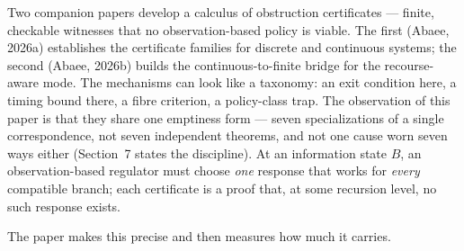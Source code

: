\documentclass[10pt,twocolumn]{article}
\theoremstyle{definition}
\begin{document}
Two companion papers develop a calculus of obstruction certificates --- finite,
checkable witnesses that no observation-based policy is viable. The first
(Abaee, 2026a) establishes the certificate families for discrete and
continuous systems; the second (Abaee, 2026b) builds the
continuous-to-finite bridge for the recourse-aware mode. The mechanisms can
look like a taxonomy: an exit condition here, a timing bound there, a fibre
criterion, a policy-class trap. The observation of this paper is that they
share one emptiness form --- seven specializations of a single
correspondence, not seven independent theorems, and not one cause worn
seven ways either (Section~7 states the discipline). At an information
state \(B\), an observation-based regulator must choose \emph{one}
response that works for \emph{every} compatible branch; each certificate
is a proof that, at some recursion level, no such response exists.

The paper makes this precise and then measures how much it carries.
\end{document}
